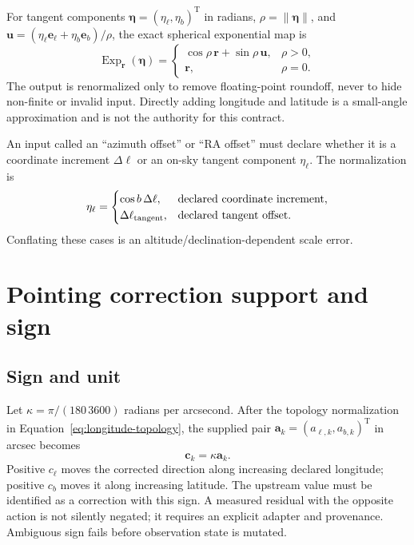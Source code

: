 \documentclass[11pt]{article}
\renewcommand{\mathsf}[1]{\mathrm{#1}}
\newcommand{\T}{\mathsf{T}}
\begin{document}
For tangent components $\boldsymbol\eta=(\eta_{\ell},\eta_b)^\T$ in radians,
$\rho=\|\boldsymbol\eta\|$, and
$\boldsymbol u=(\eta_{\ell}\boldsymbol e_{\ell}+\eta_b\boldsymbol e_b)/\rho$,
the exact spherical exponential map is
\begin{equation}
 \operatorname{Exp}_{\boldsymbol r}(\boldsymbol\eta)=
 \begin{cases}
 \cos\rho\,\boldsymbol r+\sin\rho\,\boldsymbol u,&\rho>0,\\
 \boldsymbol r,&\rho=0.
 \end{cases}
 \label{eq:exp-map}
\end{equation}
The output is renormalized only to remove floating-point roundoff, never to
hide non-finite or invalid input.  Directly adding longitude and latitude is a
small-angle approximation and is not the authority for this contract.

An input called an ``azimuth offset'' or ``RA offset'' must declare whether it
is a coordinate increment $\Delta\ell$ or an on-sky tangent component
$\eta_{\ell}$.  The normalization is
\begin{equation}
 \eta_{\ell}=\begin{cases}
  \cos b\,\Delta\ell,&\text{declared coordinate increment},\\
  \Delta\ell_{\rm tangent},&\text{declared tangent offset}.
 \end{cases}
 \label{eq:longitude-topology}
\end{equation}
Conflating these cases is an altitude/declination-dependent scale error.

\section{Pointing correction support and sign}

\subsection{Sign and unit}

Let $\kappa=\pi/(180\,3600)$ radians per arcsecond.  After the topology
normalization in Equation~\eqref{eq:longitude-topology}, the supplied pair
$\boldsymbol a_k=(a_{\ell,k},a_{b,k})^\T$ in arcsec becomes
\begin{equation}
 \boldsymbol c_k=\kappa\boldsymbol a_k.
 \label{eq:offset-unit}
\end{equation}
Positive $c_{\ell}$ moves the corrected direction along increasing declared
longitude; positive $c_b$ moves it along increasing latitude.  The upstream
value must be identified as a correction with this sign.  A measured residual
with the opposite action is not silently negated; it requires an explicit
adapter and provenance.  Ambiguous sign fails before observation state is
mutated.
\end{document}
